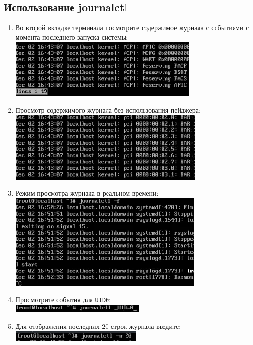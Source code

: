 \documentclass[12pt]{article}
\begin{document}
\subsection{Использование journalctl}
\begin{enumerate}
	\item Во второй вкладке терминала посмотрите содержимое журнала с событиями с момента последнего запуска системы:
	      \\\includegraphics{14.png}
	\item Просмотр содержимого журнала без использования пейджера:
	      \\\includegraphics{15.png}
	\item Режим просмотра журнала в реальном времени:
	      \\\includegraphics{16.png}
	\item Просмотрите события для \texttt{UID0}:
	      \\\includegraphics{17.png}
	\item Для отображения последних 20 строк журнала введите:
	      \\\includegraphics{18.png}

\end{enumerate}
\end{document}
